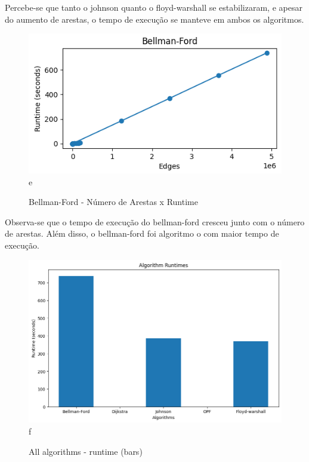 \documentclass[12pt]{article}
\begin{document}
Percebe-se que tanto o johnson quanto o floyd-warshall se estabilizaram, e apesar do aumento de arestas, o tempo de execução se manteve em ambos os algoritmos.

\begin{figure}[H]
    \centering
        \includegraphics[scale=1]{bf.png}{e}
        \caption{Bellman-Ford - Número de Arestas x Runtime}
\end{figure}

Observa-se que o tempo de execução do bellman-ford cresceu junto com o número de arestas. Além disso, o bellman-ford foi algoritmo o com maior tempo de execução.

\begin{figure}[H]
    \centering
        \includegraphics[scale=0.5]{allByTime_bars.png}{f}
        \caption{All algorithms - runtime (bars)}
\end{figure}
\end{document}
